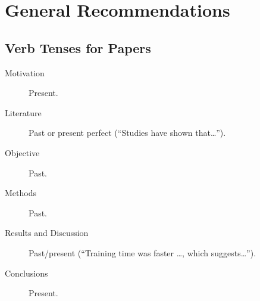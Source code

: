 \documentclass[10pt,a4paper,twocolumn]{scrartcl}
\newcommand{\hl}[1]{{\color{Green!50!YellowGreen}#1}}
\begin{document}
\section{General Recommendations}
\subsection{Verb Tenses for Papers}
\begin{description}
    \item[Motivation] Present.
    \item[Literature] Past or present perfect (``Studies have shown that\dots'').
    \item[Objective] Past.
    \item[Methods] Past.
    \item[Results and Discussion] Past/present (``Training time \hl{was} faster \dots, which \hl{suggests}\dots'').
    \item[Conclusions] Present.
\end{description}
\end{document}
